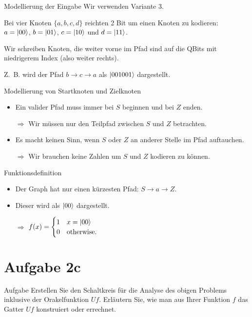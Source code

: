 \documentclass[fleqn,compress,utf8,aspectratio=169,t]{beamer}
\begin{document}
\begin{frame}{Modellierung der Eingabe}
Wir verwenden Variante 3.

Bei vier Knoten $\{a, b, c, d\}$ reichten 2 Bit um einen Knoten zu kodieren:\\
$a = \ket{00}$, $b = \ket{01}$, $c = \ket{10}$ und $d = \ket{11}$.

Wir schreiben Knoten, die weiter vorne im Pfad sind auf die QBits mit niedrigerem Index (also weiter rechts).

Z.~B. wird der Pfad $b \rightarrow c \rightarrow a$ als $\ket{001001}$ dargestellt.
\end{frame}

\begin{frame}{Modellierung von Startknoten und Zielknoten}
\begin{itemize}
	\item Ein valider Pfad muss immer bei $S$ beginnen und bei $Z$ enden.
	\item[$\Rightarrow$] Wir müssen nur den Teilpfad zwischen $S$ und $Z$ betrachten.
	\item Es macht keinen Sinn, wenn $S$ oder $Z$ an anderer Stelle im Pfad auftauchen.
	\item[$\Rightarrow$] Wir brauchen keine Zahlen um $S$ und $Z$ kodieren zu können.
\end{itemize}
\end{frame}

\begin{frame}{Funktionsdefinition}
\begin{itemize}
	\item Der Graph hat nur einen kürzesten Pfad: $S \rightarrow a \rightarrow Z$.
	\item Dieser wird als $\ket{00}$ dargestellt.
	\item[$\Rightarrow$] $f(x) = \begin{cases}
	1 & x = \ket{00}\\
	0 & \text{otherwise.}\\
	\end{cases}$
\end{itemize}
\end{frame}

\section{Aufgabe 2c}

\begin{frame}{Aufgabe}
Erstellen Sie den Schaltkreis für die Analyse des obigen Problems inklusive der Orakelfunktion $Uf$. Erläutern Sie, wie man aus Ihrer Funktion $f$ das Gatter $Uf$ konstruiert oder errechnet.
\end{frame}
\end{document}
